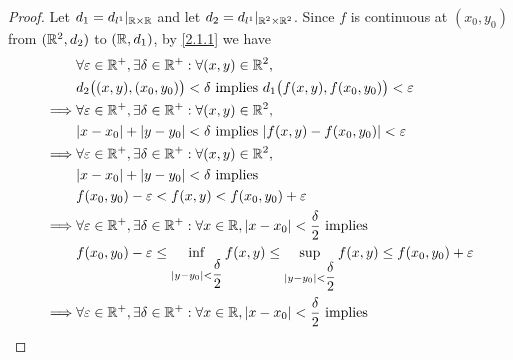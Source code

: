 \begin{proof}
  Let \(d_1 = d_{l^1}|_{\mathbb{R} \times \mathbb{R}}\) and let \(d_2 = d_{l^1}|_{\mathbb{R}^2 \times \mathbb{R}^2}\).
  Since \(f\) is continuous at \((x_0, y_0)\) from \((\mathbb{R}^2, d_2)\) to \((\mathbb{R}, d_1)\), by \cref{2.1.1} we have
  \begin{align*}
             & \forall \varepsilon \in \R^+, \exists \delta \in \R^+ : \forall (x, y) \in \R^2,                                                                                             \\
             & d_2\big((x, y), (x_0, y_0)\big) < \delta \text{ implies } d_1\big(f(x, y), f(x_0, y_0)\big) < \varepsilon                                                                    \\
    \implies & \forall \varepsilon \in \R^+, \exists \delta \in \R^+ : \forall (x, y) \in \R^2,                                                                                             \\
             & \abs{x - x_0} + \abs{y - y_0} < \delta \text{ implies } \abs{f(x, y) - f(x_0, y_0)} < \varepsilon                                                                            \\
    \implies & \forall \varepsilon \in \R^+, \exists \delta \in \R^+ : \forall (x, y) \in \R^2,                                                                                             \\
             & \abs{x - x_0} + \abs{y - y_0} < \delta \text{ implies}                                                                                                                       \\
             & f(x_0, y_0) - \varepsilon < f(x, y) < f(x_0, y_0) + \varepsilon                                                                                                              \\
    \implies & \forall \varepsilon \in \R^+, \exists \delta \in \R^+ : \forall x \in \R, \abs{x - x_0} < \dfrac{\delta}{2} \text{ implies}                                                  \\
             & f(x_0, y_0) - \varepsilon \leq \inf_{\abs{y - y_0} < \dfrac{\delta}{2}} f(x, y) \leq \sup_{\abs{y - y_0} < \dfrac{\delta}{2}} f(x, y) \leq f(x_0, y_0) + \varepsilon         \\
    \implies & \forall \varepsilon \in \R^+, \exists \delta \in \R^+ : \forall x \in \R, \abs{x - x_0} < \dfrac{\delta}{2} \text{ implies}                                                  \\

\end{align*}
\end{proof}
